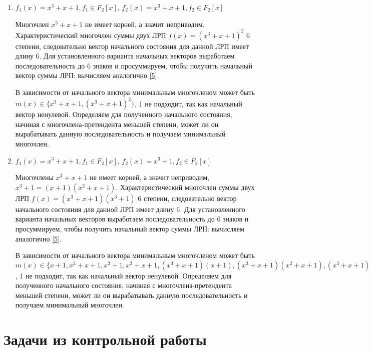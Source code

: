 \documentclass[utf8x, 14pt]{G7-32} %
\begin{document}
\begin{enumerate}
     \item $f_1(x) = x^3+x+1, f_1\in F_2[x]$, $f_2(x) = x^3+x+1, f_2\in F_2[x]$
    
     Многочлен $x^3+x+1$ не имеет корней, а значит неприводим. Характеристический многочлен суммы двух ЛРП $f(x) = (x^3+x+1)^2$ 6 степени, следовательно вектор начального состояния для данной ЛРП имеет длину 6. Для установленного варианта начальных векторов выработаем последовательность до 6 знаков и просуммируем, чтобы получить начальный вектор суммы ЛРП: вычисляем аналогично \ref{5}.
     
     В зависимости от начального вектора минимальным многочленом может быть $m(x)\in\{x^3+x+1, (x^3+x+1)^2\}$, 1 не подходит, так как начальный вектор ненулевой. Определяем для полученного начального состояния, начиная с многочлена-претендента меньшей степени, может ли он вырабатывать данную последовательность и получаем минимальный многочлен.
     
     \item $f_1(x) = x^3+x+1, f_1\in F_2[x]$, $f_2(x) = x^3+1, f_2\in F_2[x]$
    
     Многочлены $x^3+x+1$  не имеет корней, а значит неприводим, $x^3+1 = (x+1)(x^2+x+1)$. Характеристический многочлен суммы двух ЛРП $f(x) = (x^3+x+1)(x^3+1)$ 6 степени, следовательно вектор начального состояния для данной ЛРП имеет длину 6. Для установленного варианта начальных векторов выработаем последовательность до 6 знаков и просуммируем, чтобы получить начальный вектор суммы ЛРП: вычисляем аналогично \ref{5}.
     
     В зависимости от начального вектора минимальным многочленом может быть $m(x)\in\{x+1, x^2+x+1, x^3+1, x^3+x+1, (x^3+x+1)(x+1), (x^3+x+1)(x^2+x+1), (x^3+x+1)(x^3+1)\}$, 1 не подходит, так как начальный вектор ненулевой. Определяем для полученного начального состояния, начиная с многочлена-претендента меньшей степени, может ли он вырабатывать данную последовательность и получаем минимальный многочлен.
\end{enumerate}
\section{Задачи из контрольной работы }
\end{document}
